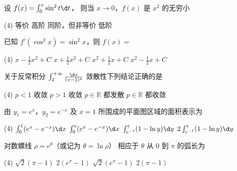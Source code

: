 \documentclass[quiet]{ctexart}
\begin{document}
\begin{problem}
  设 $f(x) = \int_0^x \sin^2 t \d t$，
  则当 $x \to 0$，$f(x)$ 是 $x^2$ 的\result*无穷小
  \begin{tasks}(4)
    \task 等价
    \task[\true] 高阶
    \task 同阶，但非等价
    \task 低阶
  \end{tasks}
\end{problem}
\begin{solution}
  
\end{solution}

\begin{problem}
  已知 $f'(\cos^2 x) = \sin^2 x$，则 $f(x) = $
  \begin{tasks}(4)
    \task $x - \frac12 x^2 + C$
    \task[\true] $x + \frac12 x^2 + C$
    \task $x^2 + \frac12 x + C$
    \task $x^2 - \frac12 x + C$
  \end{tasks}
\end{problem}
\begin{solution}
  
\end{solution}

\begin{problem}
  关于反常积分 $\int_2^{+\infty} \frac{\d x}{(x - 1)^p}$ 敛散性下列结论正确的是
  \begin{tasks}(4)
    \task[\true] $p < 1$ 收敛
    \task $p > 1$ 收敛
    \task $p \in \mathbb R$ 都发散
    \task $p \in \mathbb R$ 都收敛
  \end{tasks}
\end{problem}
\begin{solution}
  
\end{solution}

\begin{problem}
  由 $y_1 = e^x$，$y_2 = e^{-x}$ 及 $x = 1$ 所围成的平面图区域的面积表示为
  \begin{tasks}(4)
    \task[\true] $\int_0^1 (e^x - e^{-x}) \d x$
    \task $\int_0^e (e^x - e^{-x}) \d x$
    \task $\int_{e^{-1}}^e (1 - \ln y) \d y$
    \task $2\int_{e^{-1}}^e (1 - \ln y) \d y$
  \end{tasks}
\end{problem}
\begin{solution}
  
\end{solution}

\begin{problem}
  对数螺线 $\rho = e^\theta$（或记为 $\theta  = \ln\rho$）
  相应于 $\theta$ 从 $0$ 到 $\pi$ 的弧长为
  \begin{tasks}(4)
    \task $\sqrt2(\pi - 1)$
    \task $2(e^\pi - 1)$
    \task[\true] $\sqrt2(e^\pi - 1)$
    \task $2(\pi - 1)$
  \end{tasks}
\end{problem}
\begin{solution}
  
\end{solution}
\end{document}
